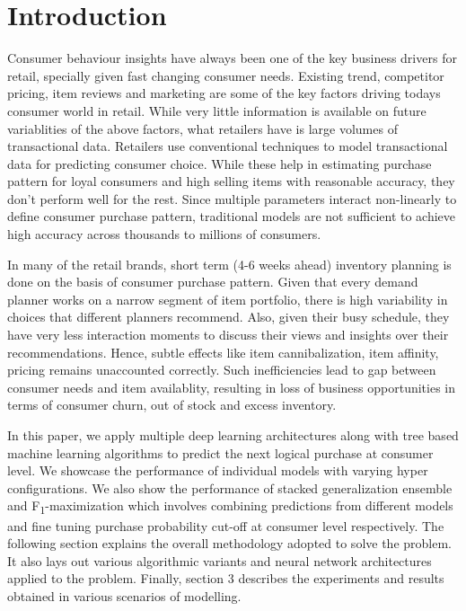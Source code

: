 \section{Introduction}
Consumer behaviour insights have always been one of the key business drivers for retail, specially given
fast changing consumer needs. Existing trend, competitor pricing, item reviews and marketing are some of the 
key factors driving todays consumer world in retail. While very little information is available
on future variablities of the above factors, what retailers have is large volumes of transactional data.
Retailers use conventional techniques to model transactional data for predicting consumer choice. 
While these help in estimating purchase pattern for loyal consumers and high selling items with reasonable accuracy, they 
don't perform well for the rest. Since multiple parameters interact non-linearly to define consumer purchase pattern,
traditional models are not sufficient to achieve high accuracy across thousands to millions of consumers.

In many of the retail brands, short term (4-6 weeks ahead) inventory planning is done on the basis of consumer 
purchase pattern. Given that every demand planner works on a narrow segment of item portfolio, there is high 
variability in choices that different planners recommend. Also, given their busy schedule, they have very less interaction
moments to discuss their views and insights over their recommendations. Hence, subtle effects like item cannibalization,
item affinity, pricing remains unaccounted correctly. Such inefficiencies lead to gap between consumer needs 
and item availablity, resulting in loss of business opportunities in terms of consumer churn, out of stock 
and excess inventory.

In this paper, we apply multiple deep learning architectures along with tree based machine learning algorithms
to predict the next logical purchase at consumer level. We showcase the performance of individual models with 
varying hyper configurations. We also show the performance of stacked generalization ensemble and F\textsubscript{1}-maximization 
which involves combining predictions from different models and fine tuning purchase probability cut-off at
consumer level respectively. The following section explains the overall methodology adopted to solve the problem.
It also lays out various algorithmic variants and neural network architectures applied to the problem.
Finally, section 3 describes the experiments and results obtained in various scenarios of modelling.

